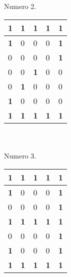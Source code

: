 \documentclass[40pt]{article}
\begin{document}
\maketitle
\textsf{\\
\\
Numero 2.\\}

\vspace{0.0 cm}
\begin{table}[h!]
\begin{tabular}{|p{.3 cm}|p{.3 cm}|p{.3 cm}|p{.3 cm}|p{.3 cm}| }
\hline
\textbf{1}&\textbf{1}&\textbf{1}&\textbf{1}&\textbf{1}
\\\hline
\textbf{1}&0&0&0&\textbf{1}
\\\hline
0&0&0&0&\textbf{1}
\\\hline
0&0&\textbf{1}&0&0
\\\hline
0&\textbf{1}&0&0&0
\\\hline
\textbf{1}&0&0&0&0
\\\hline
\textbf{1}&\textbf{1}&\textbf{1}&\textbf{1}&\textbf{1}
\\\hline
\end{tabular}
\end{table}


\maketitle
\textsf{\\
\\
Numero 3.\\}

\vspace{0.0 cm}
\begin{table}[h!]
\begin{tabular}{|p{.3 cm}|p{.3 cm}|p{.3 cm}|p{.3 cm}|p{.3 cm}| }
\hline
\textbf{1}&\textbf{1}&\textbf{1}&\textbf{1}&\textbf{1}
\\\hline
\textbf{1}&0&0&0&\textbf{1}
\\\hline
0&0&0&0&\textbf{1}
\\\hline
\textbf{1}&\textbf{1}&\textbf{1}&\textbf{1}&\textbf{1}
\\\hline
0&0&0&0&\textbf{1}
\\\hline
\textbf{1}&0&0&0&\textbf{1}
\\\hline
\textbf{1}&\textbf{1}&\textbf{1}&\textbf{1}&\textbf{1}
\\\hline
\end{tabular}
\end{table}
\end{document}
